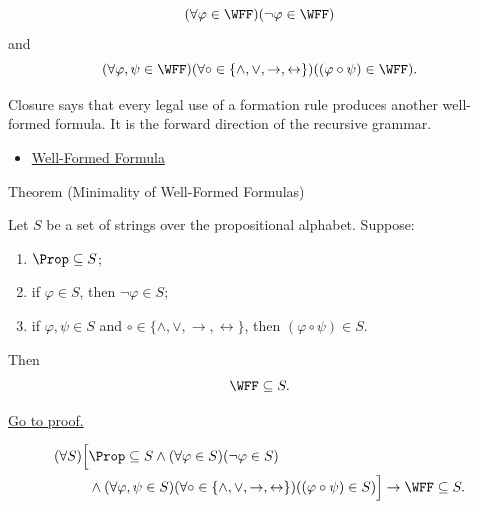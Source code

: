\begin{remark*}
\[
(\forall\varphi\in\WFF)(\neg\varphi\in\WFF)
\]
and
\[
(\forall\varphi,\psi\in\WFF)
(\forall\circ\in\{\land,\lor,\to,\leftrightarrow\})
((\varphi\circ\psi)\in\WFF).
\]
\end{remark*}

\begin{remark*}[Interpretation]
Closure says that every legal use of a formation rule produces another
well-formed formula. It is the forward direction of the recursive grammar.
\end{remark*}

\begin{dependencies}
\begin{itemize}
  \item \hyperref[def:well-formed-formula]{Well-Formed Formula}
\end{itemize}
\end{dependencies}
\begin{theorembox}{Theorem (Minimality of Well-Formed Formulas)}
\begin{theorem}
\label{thm:minimality-of-well-formed-formulas}
Let \(S\) be a set of strings over the propositional alphabet. Suppose:
\begin{enumerate}
  \item \(\Prop\subseteq S\);
  \item if \(\varphi\in S\), then \(\neg\varphi\in S\);
  \item if \(\varphi,\psi\in S\) and
        \(\circ\in\{\land,\lor,\to,\leftrightarrow\}\), then
        \((\varphi\circ\psi)\in S\).
\end{enumerate}
Then
\[
\WFF\subseteq S.
\]

\noindent\hyperref[prf:minimality-of-well-formed-formulas]{Go to proof.}
\end{theorem}
\end{theorembox}

\begin{remark*}
\[
\begin{aligned}
(\forall S)\Big[
&\Prop\subseteq S
\land
(\forall\varphi\in S)(\neg\varphi\in S)\\
&\land
(\forall\varphi,\psi\in S)
(\forall\circ\in\{\land,\lor,\to,\leftrightarrow\})
((\varphi\circ\psi)\in S)
\Big]
\to
\WFF\subseteq S.
\end{aligned}
\]
\end{remark*}

